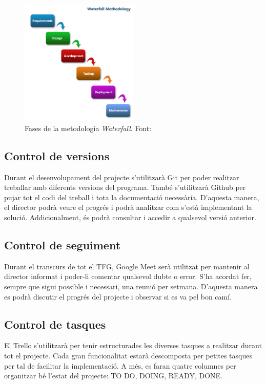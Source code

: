 \documentclass[a4paper]{article}
\begin{document}
\begin{figure}[H]
    \centering
    \includegraphics[width=0.5\textwidth]{images/Waterfall-Metodology.png}
    \caption{Fases de la metodologia \textit{Waterfall}. Font: \cite{waterfallImage}}
    \label{fig:WaterfallImage}
\end{figure}

\subsection{Control de versions}

Durant el desenvolupament del projecte s'utilitzarà Git per poder realitzar treballar amb diferents versions del programa. També s'utilitzarà Github per pujar tot el codi del treball i tota la documentació necessària. D'aquesta manera, el director podrà veure el progrés i podrà analitzar com s'està implementant la solució. Addicionalment, és podrà consultar i accedir a qualsevol versió anterior.

\subsection{Control de seguiment}
    
Durant el transcurs de tot el TFG, Google Meet serà utilitzat per mantenir al director informat i poder-li comentar qualsevol dubte o error. S'ha acordat fer, sempre que sigui possible i necessari, una reunió per setmana. D'aquesta manera es podrà discutir el progrés del projecte i observar si es va pel bon camí.

\subsection{Control de tasques}

El Trello s'utilitzarà per tenir estructurades les diverses tasques a realitzar durant tot el projecte. Cada gran funcionalitat estarà descomposta per petites tasques per tal de facilitar la implementació. A més, es faran quatre columnes per organitzar bé l'estat del projecte: TO DO, DOING, READY, DONE.
\end{document}
